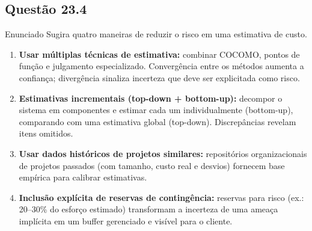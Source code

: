 \documentclass[12pt,a4paper]{article}
\begin{document}
\subsection*{Questão 23.4}
\begin{questao}{Enunciado}
Sugira quatro maneiras de reduzir o risco em uma estimativa de custo.
\end{questao}
\begin{resposta}
\begin{enumerate}[nosep]
  \item \textbf{Usar múltiplas técnicas de estimativa:} combinar COCOMO,
        pontos de função e julgamento especializado. Convergência entre os
        métodos aumenta a confiança; divergência sinaliza incerteza que
        deve ser explicitada como risco.
  \item \textbf{Estimativas incrementais (top-down + bottom-up):} decompor o
        sistema em componentes e estimar cada um individualmente (bottom-up),
        comparando com uma estimativa global (top-down). Discrepâncias revelam
        itens omitidos.
  \item \textbf{Usar dados históricos de projetos similares:} repositórios
        organizacionais de projetos passados (com tamanho, custo real e
        desvios) fornecem base empírica para calibrar estimativas.
  \item \textbf{Inclusão explícita de reservas de contingência:} reservas
        para risco (ex.: 20--30\% do esforço estimado) transformam a
        incerteza de uma ameaça implícita em um buffer gerenciado e visível
        para o cliente.
\end{enumerate}
\end{resposta}

\end{document}
